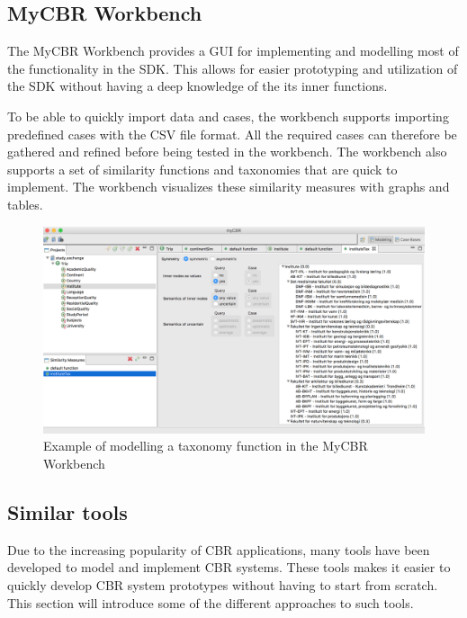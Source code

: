 \subsection{MyCBR Workbench}

The MyCBR Workbench provides a GUI for implementing and modelling most of the functionality in the SDK. This allows for easier prototyping and utilization of the SDK without having a deep knowledge of the its inner functions\cite{bach2014knowledge}. 

To be able to quickly import data and cases, the workbench supports importing predefined cases with the CSV file format. All the required cases can therefore be gathered and refined before being tested in the workbench. The workbench also supports a set of similarity functions and taxonomies that are quick to implement. The workbench visualizes these similarity measures with graphs and tables.

\begin{figure}[H]
    \centering
    \includegraphics[width=1\textwidth]{fig/myCBRworkbench.png}
    \caption{Example of modelling a taxonomy function in the MyCBR Workbench}
\end{figure}

\subsection{Similar tools}

Due to the increasing popularity of CBR applications\cite{kolodner2014case}, many tools have been developed to model and implement CBR systems. These tools makes it easier to quickly develop CBR system prototypes without having to start from scratch. This section will introduce some of the different approaches to such tools.

